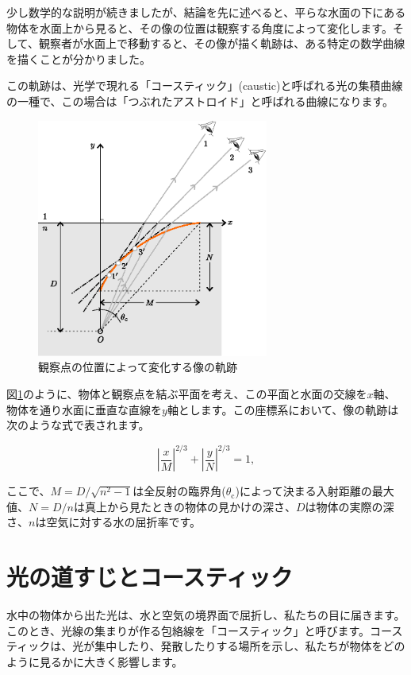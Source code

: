 \documentclass[twocolumn]{article}
\begin{document}
	少し数学的な説明が続きましたが、結論を先に述べると、平らな水面の下にある物体を水面上から見ると、その像の位置は観察する角度によって変化します。そして、観察者が水面上で移動すると、その像が描く軌跡は、ある特定の数学曲線を描くことが分かりました。
	
	この軌跡は、光学で現れる「コースティック」(caustic)と呼ばれる光の集積曲線の一種で、この場合は「つぶれたアストロイド」と呼ばれる曲線になります。
	
	\begin{figure}[h]
		\centering
		\includegraphics[width=3in]{figs/g409.eps}
		\caption{観察点の位置によって変化する像の軌跡}
		\label{fig:caustic}
	\end{figure}
	
	図\ref{fig:caustic}のように、物体と観察点を結ぶ平面を考え、この平面と水面の交線を$x$軸、物体を通り水面に垂直な直線を$y$軸とします。この座標系において、像の軌跡は次のような式で表されます。
	
	$$ \left| \dfrac{x}{M} \right| ^ {2/3} 
	+ \left| \dfrac{y}{N} \right| ^ {2/3} = 1,$$
	
	ここで、$M = D/\sqrt{n^2 - 1}$は全反射の臨界角($\theta_{\mathrm{c}}$)によって決まる入射距離の最大値、$N = D/n$は真上から見たときの物体の見かけの深さ、$D$は物体の実際の深さ、$n$は空気に対する水の屈折率です。
	
	\section{光の道すじとコースティック}
	
	水中の物体から出た光は、水と空気の境界面で屈折し、私たちの目に届きます。このとき、光線の集まりが作る包絡線を「コースティック」と呼びます。コースティックは、光が集中したり、発散したりする場所を示し、私たちが物体をどのように見るかに大きく影響します。
	
\end{document}
